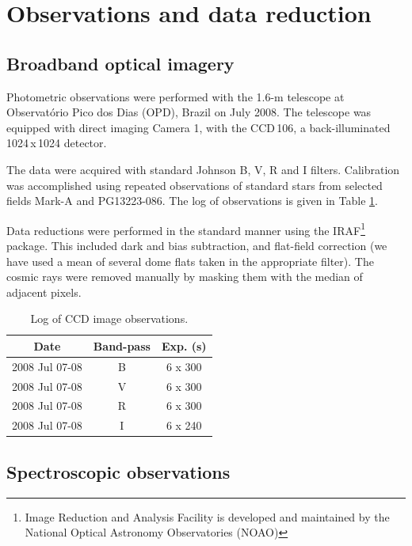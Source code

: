 \documentclass[useAMS,usenatbib]{mn2e}
\begin{document}
\section{Observations and data reduction} \label{sec3}

\subsection{Broadband optical imagery}

Photometric observations were performed with the 1.6-m telescope at
Observat\'orio Pico dos Dias (OPD), Brazil 
on July 2008. The telescope was equipped with direct imaging Camera 1, with the
CCD\,106, a back-illuminated 
1024\,x\,1024 detector. 

The data were acquired with standard Johnson B, V, R and I filters. Calibration
was accomplished using repeated observations of standard stars from 
\cite{1992AJ....104..340L} selected fields Mark-A and PG13223-086. The log of
observations is given in Table \ref{obs}. 

Data reductions were performed in the standard manner using the 
IRAF\footnote[1]{Image Reduction and Analysis Facility is developed and
maintained by 
the National Optical Astronomy Observatories (NOAO)} package. This included dark
and 
bias subtraction, and flat-field correction (we have used a mean of several dome
flats 
taken in the appropriate filter). The cosmic rays were removed manually by
masking them 
with the median of adjacent pixels.


\begin{table}
  \begin{center}
    \caption {Log of CCD image observations.}
    \label{obs}
    \begin{tabular}{|c|c|c|}
      \hline
      \textbf{Date} & \textbf{Band-pass} & \textbf{Exp. (s)}\\
      \hline
      \hline

      2008 Jul 07-08 & B & 6 x 300 \\
      2008 Jul 07-08 & V & 6 x 300 \\
      2008 Jul 07-08 & R & 6 x 300 \\
      2008 Jul 07-08 & I & 6 x 240 \\

      \hline
    \end{tabular}
  \end{center}
\end{table}

\subsection{Spectroscopic observations}
\end{document}
